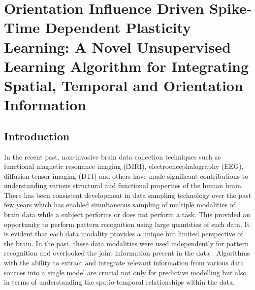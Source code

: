 \chapter{Orientation Influence Driven Spike-Time Dependent Plasticity Learning: A Novel Unsupervised Learning Algorithm for Integrating Spatial, Temporal and Orientation Information}
\label{chap:multimodal}
\section{Introduction}
\label{sec:introduction}
In the recent past, non-invasive brain data collection techniques such as functional magnetic resonance imaging (fMRI), electroencephalography (EEG), diffusion tensor imaging (DTI) and others have made significant contributions to understanding various structural and functional properties of the human brain. There has been consistent development in data sampling technology over the past few years which has enabled simultaneous sampling of multiple modalities of brain data while a subject performs or does not perform a task. This provided an opportunity to perform pattern recognition using large quantities of such data. It is evident that each data modality provides a unique but limited perspective of the brain. In the past, these data modalities were used independently for pattern recognition and overlooked the joint information present in the data \citep{sui2012review}. Algorithms with the ability to extract and integrate relevant information from various data sources into a single model are crucial not only for predictive modelling but also in terms of understanding the spatio-temporal relationships within the data.

